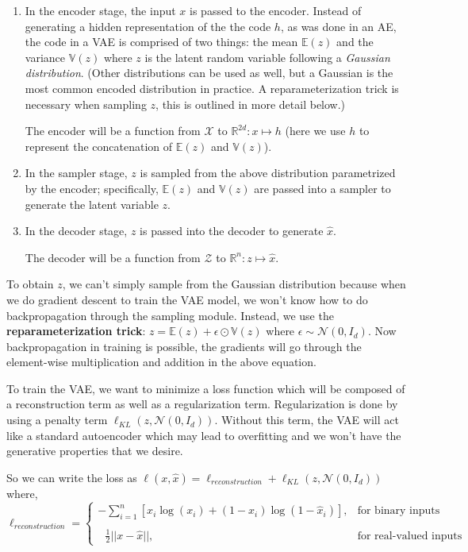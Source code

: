 \documentclass{article}
\begin{document}
\begin{enumerate}
    \item In the encoder stage, the input $x$ is passed to the encoder. Instead of generating a hidden representation of the the code $h$, as was done in an AE, the code in a VAE is comprised of two things: the mean $\mathbb{E}(z)$ and the variance  $\mathbb{V}(z)$ where $z$ is the latent random variable following a \textit{Gaussian distribution}. (Other distributions can be used as well, but a Gaussian is the most common encoded distribution in practice. A reparameterization trick is necessary when sampling $z$, this is outlined in more detail below.)
    
    The encoder will be a function from $\mathcal{X}$ to $\mathbb{R}^{2d} : x \mapsto {h}$ (here we use $h$ to represent the concatenation of $\mathbb{E}({z})$ and $\mathbb{V}({z})$).
    
    \item In the sampler stage, $z$ is sampled from the above distribution parametrized by the encoder; specifically, $\mathbb{E}({z})$ and $\mathbb{V}({z})$ are passed into a sampler to generate the latent variable $z$.
    
    \item In the decoder stage, $z$ is passed into the decoder to generate $\hat{x}$.
    
    The decoder will be a function from $\mathcal{Z}$ to $\mathbb{R}^{n}: z \mapsto \hat{x}$.
\end{enumerate}

To obtain $z$, we can't simply sample from the Gaussian distribution because when we do gradient descent to train the VAE model, we won’t know how to do backpropagation through the sampling module. Instead, we use the \textbf{reparameterization trick}: $z = \mathbb E (z) + \epsilon \odot \mathbb V(z)$ where $\epsilon\sim \mathcal{N}(0, {I}_d)$. Now backpropagation in training is possible, the gradients will go through the element-wise multiplication and addition in the above equation.

To train the VAE, we want to minimize a loss function which will be composed of a reconstruction term as well as a regularization term. Regularization is done by using a penalty term $\ell_{KL}(z, \mathcal N(0, I_d))$. Without this term, the VAE will act like a standard autoencoder which may lead to overfitting and we won’t have the generative properties that we desire.

So we can write the loss as $\ell(x, \hat x) = \ell_{reconstruction} + \ell_{KL}(z, \mathcal N(0, I_d))$ where,
\[
    \ell_{reconstruction}= 
    \begin{cases}
        -\displaystyle \sum_{i=1}^{n}[x_i \log(x_i) + (1-x_i)\log(1-\hat x_i)] , & \text{for binary inputs}\\ \\ 
        \ \ \ \displaystyle \frac{1}{2}||x -\hat x||, & \text{for real-valued inputs}
    \end{cases}
\]
\end{document}
